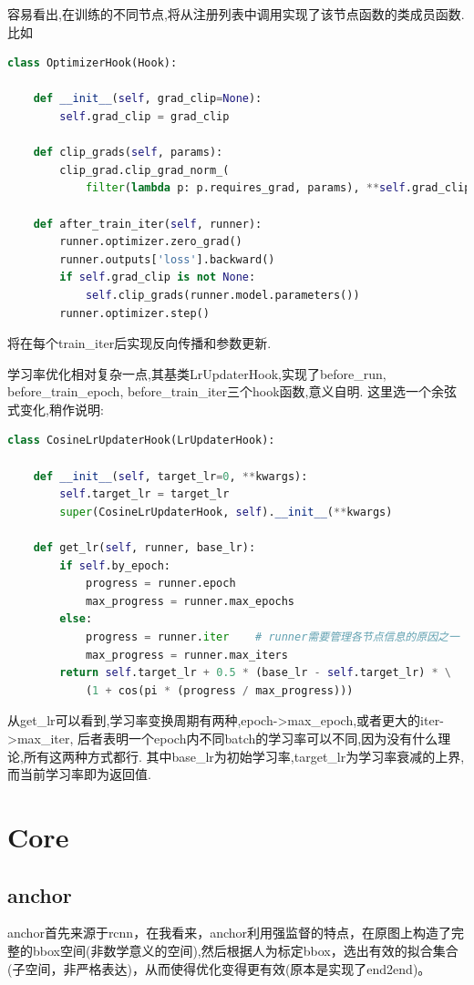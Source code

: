 \documentclass[UTF8]{ctexart}
\begin{document}
容易看出,在训练的不同节点,将从注册列表中调用实现了该节点函数的类成员函数.比如

\lstset{style=mystyle}
\begin{lstlisting}[language=Python]
class OptimizerHook(Hook):

    def __init__(self, grad_clip=None):
        self.grad_clip = grad_clip

    def clip_grads(self, params):
        clip_grad.clip_grad_norm_(
            filter(lambda p: p.requires_grad, params), **self.grad_clip)

    def after_train_iter(self, runner):
        runner.optimizer.zero_grad()
        runner.outputs['loss'].backward()
        if self.grad_clip is not None:
            self.clip_grads(runner.model.parameters())
        runner.optimizer.step()
\end{lstlisting}
将在每个train\_iter后实现反向传播和参数更新.

学习率优化相对复杂一点,其基类LrUpdaterHook,实现了before\_run, before\_train\_epoch, before\_train\_iter三个hook函数,意义自明.
这里选一个余弦式变化,稍作说明:

\lstset{style=mystyle}
\begin{lstlisting}[language=Python]
class CosineLrUpdaterHook(LrUpdaterHook):

    def __init__(self, target_lr=0, **kwargs):
        self.target_lr = target_lr
        super(CosineLrUpdaterHook, self).__init__(**kwargs)

    def get_lr(self, runner, base_lr):
        if self.by_epoch:
            progress = runner.epoch
            max_progress = runner.max_epochs
        else:
            progress = runner.iter    # runner需要管理各节点信息的原因之一
            max_progress = runner.max_iters
        return self.target_lr + 0.5 * (base_lr - self.target_lr) * \
			(1 + cos(pi * (progress / max_progress)))
\end{lstlisting}
从get\_lr可以看到,学习率变换周期有两种,epoch->max\_epoch,或者更大的iter->max\_iter,
后者表明一个epoch内不同batch的学习率可以不同,因为没有什么理论,所有这两种方式都行.
其中base\_lr为初始学习率,target\_lr为学习率衰减的上界,而当前学习率即为返回值.



\section{Core}

\subsection{anchor}
\label{core:anchor}
anchor首先来源于rcnn，在我看来，anchor利用强监督的特点，在原图上构造了完整的bbox空间(非数学意义的空间),然后根据人为标定bbox，选出有效的拟合集合(子空间，非严格表达)，从而使得优化变得更有效(原本是实现了end2end)。
\end{document}
